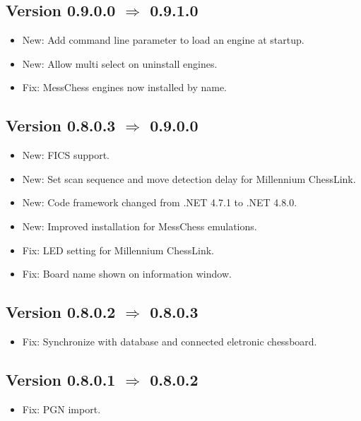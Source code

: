\documentclass[11pt,a4paper]{article}
\begin{document}
\subsection*{Version 0.9.0.0 $\Rightarrow$  0.9.1.0}
\begin{itemize}
	\item {\color{blue}New}: Add command line parameter to load an engine at startup.
	\item {\color{blue}New}: Allow multi select on uninstall engines.
	\item {\color{red}Fix}: MessChess engines now installed by name.
\end{itemize}

\subsection*{Version 0.8.0.3 $\Rightarrow$  0.9.0.0}
\begin{itemize}
	\item {\color{blue}New}: FICS support.
	\item {\color{blue}New}: Set scan sequence and move detection delay for Millennium ChessLink.
	\item {\color{blue}New}: Code framework changed from .NET 4.7.1 to .NET 4.8.0.
	\item {\color{blue}New}: Improved installation for MessChess emulations.
	\item {\color{red}Fix}: LED setting for Millennium ChessLink.
	\item {\color{red}Fix}: Board name shown on information window.	
\end{itemize}

\subsection*{Version 0.8.0.2 $\Rightarrow$  0.8.0.3}
\begin{itemize}
	\item {\color{red}Fix}: Synchronize with database and connected eletronic chessboard.
\end{itemize}

\subsection*{Version 0.8.0.1 $\Rightarrow$  0.8.0.2}
\begin{itemize}
	\item {\color{red}Fix}: PGN import.
\end{itemize}
\end{document}
